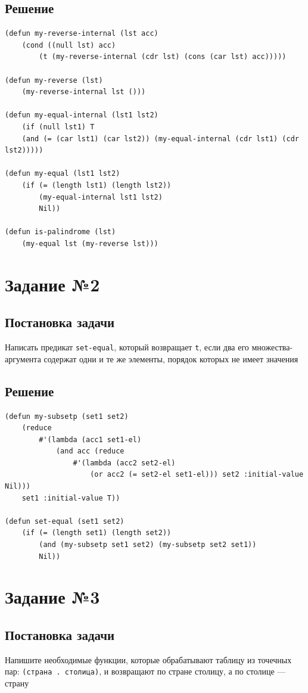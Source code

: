 \documentclass[12pt]{report}
\begin{document}
\subsection*{Решение}
\begin{lstlisting}
(defun my-reverse-internal (lst acc)
	(cond ((null lst) acc)
		(t (my-reverse-internal (cdr lst) (cons (car lst) acc)))))

(defun my-reverse (lst)
	(my-reverse-internal lst ()))

(defun my-equal-internal (lst1 lst2)
	(if (null lst1) T
	(and (= (car lst1) (car lst2)) (my-equal-internal (cdr lst1) (cdr lst2)))))

(defun my-equal (lst1 lst2)
	(if (= (length lst1) (length lst2))
		(my-equal-internal lst1 lst2)
		Nil))

(defun is-palindrome (lst)
	(my-equal lst (my-reverse lst)))
\end{lstlisting}

\section*{Задание №2}
\subsection*{Постановка задачи}
Написать предикат \texttt{set-equal}, который возвращает \texttt{t}, если два его множества-аргумента содержат одни и те же элементы, порядок которых не имеет значения

\subsection*{Решение}
\begin{lstlisting}
(defun my-subsetp (set1 set2)
	(reduce
		#'(lambda (acc1 set1-el)
			(and acc (reduce
				#'(lambda (acc2 set2-el)
					(or acc2 (= set2-el set1-el))) set2 :initial-value Nil)))
	set1 :initial-value T))

(defun set-equal (set1 set2)
	(if (= (length set1) (length set2))
		(and (my-subsetp set1 set2) (my-subsetp set2 set1))
		Nil))
\end{lstlisting}


\section*{Задание №3}
\subsection*{Постановка задачи}
Напишите необходимые функции, которые обрабатывают таблицу из точечных пар: \texttt{(страна . столица)}, и возвращают по стране столицу, а по столице --- страну
\end{document}
